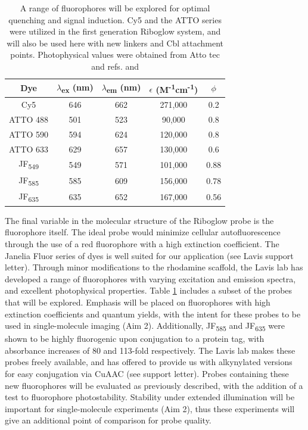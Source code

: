 \begin{table}
\caption{A range of fluorophores will be explored for optimal quenching and signal induction. Cy5 and the ATTO series were utilized in the first generation Riboglow system, and will also be used here with new linkers and Cbl attachment points. Photophysical values were obtained from Atto tec and refs. \cite{BraselmannDevelopmentriboswitchbasedplatform2017} and \cite{Grimmgeneralmethodfinetune2017}}\label{fluorophores}
\begin{tabular}{ccccc}
 Dye &  $\lambda$\textsubscript{ex} (nm) &  $\lambda$\textsubscript{em} (nm) &  $\epsilon$ (M\textsuperscript{-1}cm\textsuperscript{-1}) &  $\phi$ \\\toprule \toprule
Cy5 & 646 & 662 & 271,000 & 0.2\\  \midrule
ATTO 488 & 501 & 523 & 90,000 & 0.8\\  \midrule
ATTO 590 & 594 & 624 & 120,000 & 0.8\\  \midrule
ATTO 633 & 629 & 657 & 130,000 & 0.6\\  \midrule \midrule
JF\textsubscript{549} & 549 & 571 & 101,000 & 0.88\\  \midrule
JF\textsubscript{585} & 585 & 609 & 156,000 & 0.78\\  \midrule
JF\textsubscript{635} & 635 & 652 & 167,000 & 0.56\\  \midrule
\bottomrule
\end{tabular}
\end{table}

The final variable in the molecular structure of the Riboglow probe is the fluorophore itself. The ideal probe would minimize cellular autofluorescence through the use of a red fluorophore with a high extinction coefficient. The Janelia Fluor series of dyes is well suited for our application (see Lavis support letter).\cite{Grimmgeneralmethodfinetune2017,Grimmgeneralmethodimprove2015} Through minor modifications to the rhodamine scaffold, the Lavis lab has developed a range of fluorophores with varying excitation and emission spectra, and excellent photophysical properties.
Table \ref{fluorophores} includes a subset of the probes that will be explored.
Emphasis will be placed on fluorophores with high extinction coefficients and quantum yields, with the intent for these probes to be used in single-molecule imaging (Aim 2).
Additionally, JF\textsubscript{585} and JF\textsubscript{635} were shown to be highly fluorogenic upon conjugation to a protein tag, with absorbance increases of 80 and 113-fold respectively.\cite{Grimmgeneralmethodfinetune2017}
The Lavis lab makes these probes freely available, and has offered to provide us with alkynylated versions for easy conjugation via CuAAC (see support letter).
Probes containing these new fluorophores will be evaluated as previously described, with the addition of a test to fluorophore photostability.
Stability under extended illumination will be important for single-molecule experiments (Aim 2), thus these experiments will give an additional point of comparison for probe quality.

